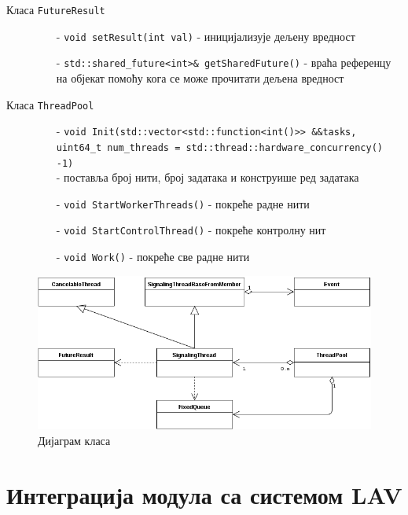 \documentclass[12pt,oneside]{memoir}
\begin{document}
\begin{description}
\begin{itemize}
		\end{itemize}			
	\item[Класа \texttt{FutureResult}]\leavevmode
		\begin{itemize}
			\item[-] \texttt{void setResult(int val)} - иницијализује дељену вредност
			\item[-] \texttt{std::shared\_future<int>\& getSharedFuture()} - враћа референцу на објекат помоћу кога се може прочитати дељена вредност			
		\end{itemize}			
	\item[Класа \texttt{ThreadPool}]\leavevmode
		\begin{itemize}
			\item[-] \texttt{void Init(std::vector<std::function<int()>> \&\&tasks, 
			\\
			uint64\_t num\_threads = std::thread::hardware\_concurrency() -1)}
			\\
			 - поставља број нити, број задатака и конструише ред задатака	
			\item[-]\texttt{void StartWorkerThreads()} - покреће радне нити 			 		\item[-] \texttt{void StartControlThread()} - покреће контролну нит
			\item[-] \texttt{void Work()} - покреће све радне нити
		\end{itemize}			
\end{description}

\begin{figure}[!ht]
  \centering
  \includegraphics[width=1.0\textwidth]{img/class_diag.png}
  \caption{Дијаграм класа}
  \label{fig:klasa_dij}
\end{figure}

\section{Интеграција модула са системом LAV}
\end{document}
